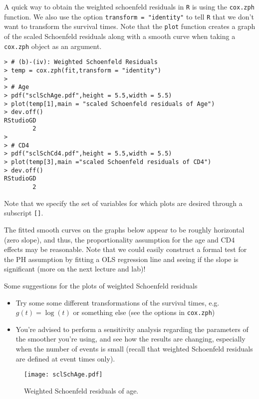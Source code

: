 \begin{enumerate}[(a)]
\begin{enumerate}[(i)]
A quick way to obtain the weighted schoenfeld residuals in \verb|R| is using the \verb|cox.zph| function. We also use the option \verb|transform = "identity"| to tell \verb|R| that we don't want to transform the survival times. Note that the \verb|plot| function creates a graph of the scaled Schoenfeld residuals along with a smooth curve when taking a \verb|cox.zph| object as an argument.
\begin{spacing}{1.2}
\begin{footnotesize}
\begin{verbatim}
> # (b)-(iv): Weighted Schoenfeld Residuals
> temp = cox.zph(fit,transform = "identity")
> 
> # Age
> pdf("sclSchAge.pdf",height = 5.5,width = 5.5)
> plot(temp[1],main = "scaled Schoenfeld residuals of Age")
> dev.off()
RStudioGD 
        2 
> 
> # CD4
> pdf("sclSchCd4.pdf",height = 5.5,width = 5.5)
> plot(temp[3],main ="scaled Schoenfeld residuals of CD4")
> dev.off()
RStudioGD 
        2  
\end{verbatim}
\end{footnotesize}
\end{spacing}
Note that we specify the set of variables for which plots are desired through a subscript \verb|[]|.

The fitted smooth curves on the graphs below appear to be roughly horizontal (zero slope), and thus, the proportionality assumption for the age and CD4 effects may be reasonable. Note that we could easily construct a formal test for the PH assumption by fitting a OLS regression line and seeing if the slope is significant (more on the next lecture and lab)!

Some suggestions for the plots of weighted Schoenfeld residuals
\begin{itemize}
\item Try some some different transformations of the survival times, e.g. $g(t)=\log(t)$ or something else (see the options in \verb|cox.zph|)
\item You're advised to perform a sensitivity analysis regarding the parameters of the smoother you're using, and see how the results are changing, especially when the number of events is small (recall that weighted Schoenfeld residuals are defined at event times only).
\end{itemize}

\begin{figure}
	\centering
		\texttt{[image: sclSchAge.pdf]}
	\caption{Weighted Schoenfeld residuals of age.}
	\label{figure4}
\end{figure}


\end{enumerate}
\end{enumerate}
